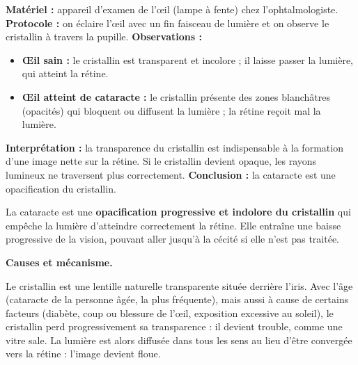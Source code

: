 \documentclass[11pt]{article}
\newcommand{\cle}[1]{{\popxbold\color{popdark}#1}}
\begin{document}
\begin{experience}
\textbf{Matériel :} appareil d'examen de l'œil (lampe à fente) chez l'ophtalmologiste.
\textbf{Protocole :} on éclaire l'œil avec un fin faisceau de lumière et on observe le cristallin à travers la pupille.
\textbf{Observations :}
\begin{itemize}
    \item \textbf{Œil sain :} le cristallin est transparent et incolore ; il laisse passer la lumière, qui atteint la rétine.
    \item \textbf{Œil atteint de cataracte :} le cristallin présente des zones blanchâtres (opacités) qui bloquent ou diffusent la lumière ; la rétine reçoit mal la lumière.
\end{itemize}
\textbf{Interprétation :} la transparence du cristallin est indispensable à la formation d'une image nette sur la rétine. Si le cristallin devient opaque, les rayons lumineux ne traversent plus correctement.
\textbf{Conclusion :} la cataracte est une opacification du cristallin.
\end{experience}

\begin{definition}[Cataracte]
La \cle{cataracte} est une \textbf{opacification progressive et indolore du cristallin} qui empêche la lumière d'atteindre correctement la rétine. Elle entraîne une baisse progressive de la vision, pouvant aller jusqu'à la cécité si elle n'est pas traitée.
\end{definition}

\textbf{Causes et mécanisme.}\par
Le cristallin est une lentille naturelle transparente située derrière l'iris. Avec l'âge (cataracte de la personne âgée, la plus fréquente), mais aussi à cause de certains facteurs (diabète, coup ou blessure de l'œil, exposition excessive au soleil), le cristallin perd progressivement sa transparence : il devient trouble, comme une vitre sale. La lumière est alors diffusée dans tous les sens au lieu d'être convergée vers la rétine : l'image devient floue.
\end{document}
